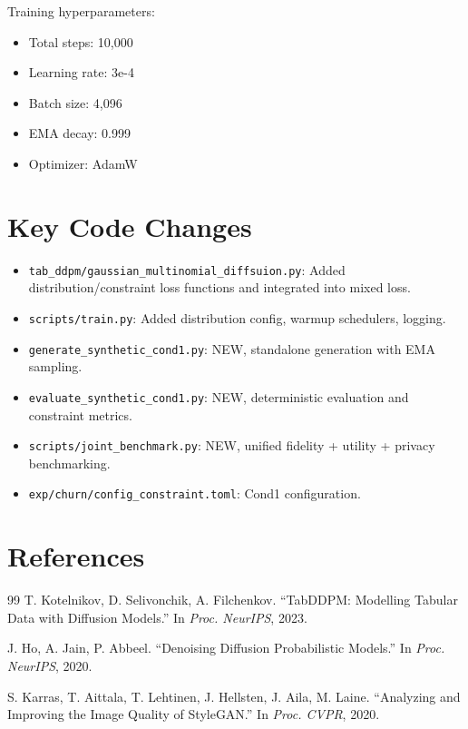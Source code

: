 \documentclass{article}
\begin{document}
Training hyperparameters:
\begin{itemize}
  \item Total steps: 10,000
  \item Learning rate: 3e-4
  \item Batch size: 4,096
  \item EMA decay: 0.999
  \item Optimizer: AdamW
\end{itemize}

\section{Key Code Changes}

\begin{itemize}
  \item \texttt{tab\_ddpm/gaussian\_multinomial\_diffsuion.py}: Added distribution/constraint loss functions and integrated into mixed loss.
  \item \texttt{scripts/train.py}: Added distribution config, warmup schedulers, logging.
  \item \texttt{generate\_synthetic\_cond1.py}: NEW, standalone generation with EMA sampling.
  \item \texttt{evaluate\_synthetic\_cond1.py}: NEW, deterministic evaluation and constraint metrics.
  \item \texttt{scripts/joint\_benchmark.py}: NEW, unified fidelity + utility + privacy benchmarking.
  \item \texttt{exp/churn/config\_constraint.toml}: Cond1 configuration.
\end{itemize}

\section*{References}

\begin{thebibliography}{99}
 T. Kotelnikov, D. Selivonchik, A. Filchenkov. ``TabDDPM: Modelling Tabular Data with Diffusion Models.'' In \textit{Proc. NeurIPS}, 2023.

 J. Ho, A. Jain, P. Abbeel. ``Denoising Diffusion Probabilistic Models.'' In \textit{Proc. NeurIPS}, 2020.

 S. Karras, T. Aittala, T. Lehtinen, J. Hellsten, J. Aila, M. Laine. ``Analyzing and Improving the Image Quality of StyleGAN.'' In \textit{Proc. CVPR}, 2020.
\end{thebibliography}

\vfill
\end{document}
